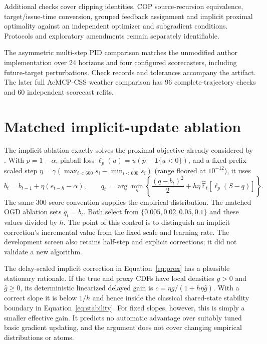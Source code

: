 \documentclass[preprint,11pt]{elsarticle}
\newcommand{\ind}{\mathbf{1}}
\begin{document}
Additional checks cover clipping identities, COP source-recursion equivalence,
target/issue-time conversion, grouped feedback assignment and implicit proximal
optimality against an independent optimizer and subgradient conditions. Protocols
and exploratory amendments remain separately identifiable.

The asymmetric multi-step PID comparison matches the unmodified author implementation
over 24 horizons and four configured scorecasters, including future-target perturbations.
Check records and tolerances accompany the artifact. The later full AcMCP-CSS
weather comparison has 96 complete-trajectory checks and 60 independent scorecast refits.

\clearpage
\section{Matched implicit-update ablation}\label{app:implicit}
The implicit ablation exactly solves the proximal objective already considered by
\citet{hu2026cop}. With $p=1-\alpha$, pinball loss $\ell_p(u)=u(p-\ind\{u<0\})$,
and a fixed prefix-scaled step $\eta=\gamma(\max_{i<600}s_i-\min_{i<600}s_i)$
(range floored at $10^{-12}$), it uses
\begin{equation}\label{eq:prox}
 b_t=b_{t-1}+\eta(e_{t-h}-\alpha),\qquad
 q_t=\arg\min_q\left\{\frac{(q-b_t)^2}{2}
       +h\eta\,\widehat{\mathbb E}_t[\ell_p(S-q)]\right\}.
\end{equation}
The same 300-score convention supplies the empirical distribution. The matched OGD
ablation sets $q_t=b_t$. Both select from $\{0.005,0.02,0.05,0.1\}$ and these values
divided by $h$. The point of this control is to distinguish an implicit correction's
incremental value from the fixed scale and learning rate. The development screen also
retains half-step and explicit corrections; it did not validate a new algorithm.

The delay-scaled implicit correction in Equation~\eqref{eq:prox} has a plausible
stationary rationale. If the true and proxy CDFs have local densities $g>0$ and
$\widehat g\geq0$, its deterministic linearized delayed gain is
$c=\eta g/(1+h\eta\widehat g)$. With a correct slope it is below $1/h$ and hence
inside the classical shared-state stability boundary in Equation~\eqref{eq:stability}.
For fixed slopes, however, this is simply a smaller effective gain. It predicts no
automatic advantage over suitably tuned basic gradient updating, and the argument
does not cover changing empirical distributions or atoms.
\end{document}
